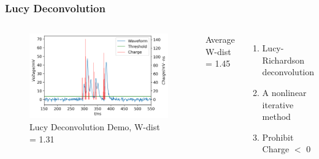 \documentclass{beamer}
\begin{document}
\begin{frame}
\frametitle{Lucy Deconvolution}
\begin{columns}
\begin{figure}
    \centering
    \caption{Lucy Deconvolution Demo, W-dist = 1.31}
    \includegraphics[width=1.0\linewidth]{img/lucyddm.png}
\end{figure}
\vspace{-4mm}
\begin{center}
    Average W-dist = 1.45
\end{center}
\begin{enumerate}
    \item Lucy-Richardson deconvolution
    \item A nonlinear iterative method
    \item Prohibit Charge $<$ 0
\end{enumerate}
\end{columns}
\end{frame}
\end{document}
